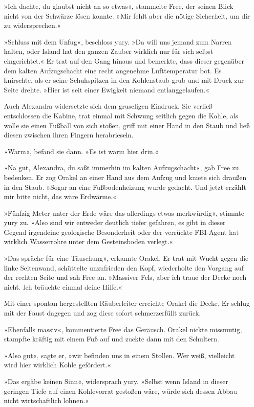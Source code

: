 »Ich dachte, du glaubst nicht an so etwas«, stammelte Free, der seinen Blick nicht von der Schwärze lösen konnte. »Mir fehlt aber die nötige Sicherheit, um dir zu widersprechen.«

»Schluss mit dem Unfug«, beschloss yury. »Da will uns jemand zum Narren halten, oder Island hat den ganzen Zauber wirklich nur für sich selbst eingerichtet.« Er trat auf den Gang hinaus und bemerkte, dass dieser gegenüber dem kalten Aufzugschacht eine recht angenehme Lufttemperatur bot. Es knirschte, als er seine Schuhspitzen in den Kohlenstaub grub und mit Druck zur Seite drehte. »Hier ist seit einer Ewigkeit niemand entlanggelaufen.«

Auch Alexandra widersetzte sich dem gruseligen Eindruck. Sie verließ entschlossen die Kabine, trat einmal mit Schwung seitlich gegen die Kohle, als wolle sie einen Fußball von sich stoßen, griff mit einer Hand in den Staub und ließ diesen zwischen ihren Fingern herabrieseln.

»Warm«, befand sie dann. »Es ist warm hier drin.«

»Na gut, Alexandra, du saßt immerhin im kalten Aufzugschacht«, gab Free zu bedenken. Er zog Orakel an einer Hand aus dem Aufzug und kniete sich draußen in den Staub. »Sogar an eine Fußbodenheizung wurde gedacht. Und jetzt erzählt mir bitte nicht, das wäre Erdwärme.«

»Fünfzig Meter unter der Erde wäre das allerdings etwas merkwürdig«, stimmte yury zu. »Also sind wir entweder deutlich tiefer gefahren, es gibt in dieser Gegend irgendeine geologische Besonderheit oder der verrückte FBI-Agent hat wirklich Wasserrohre unter dem Gesteinsboden verlegt.«

»Das spräche für eine Täuschung«, erkannte Orakel. Er trat mit Wucht gegen die linke Seitenwand, schüttelte unzufrieden den Kopf, wiederholte den Vorgang auf der rechten Seite und sah Free an. »Massiver Fels, aber ich traue der Decke noch nicht. Ich bräuchte einmal deine Hilfe.«

Mit einer spontan hergestellten Räuberleiter erreichte Orakel die Decke. Er schlug mit der Faust dagegen und zog diese sofort schmerzerfüllt zurück.

»Ebenfalls massiv«, kommentierte Free das Geräusch. Orakel nickte missmutig, stampfte kräftig mit einem Fuß auf und zuckte dann mit den Schultern.

»Also gut«, sagte er, »wir befinden uns in einem Stollen. Wer weiß, vielleicht wird hier wirklich Kohle gefördert.«

»Das ergäbe keinen Sinn«, widersprach yury. »Selbst wenn Island in dieser geringen Tiefe auf einen Kohlevorrat gestoßen wäre, würde sich dessen Abbau nicht wirtschaftlich lohnen.«

